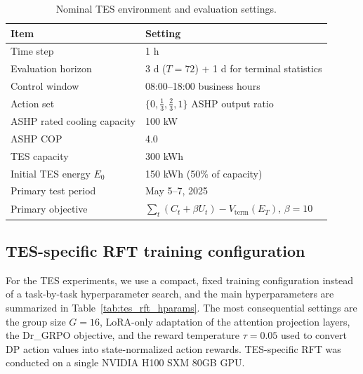 \documentclass[11pt]{article}
\begin{document}
\begin{table}[t]
\centering
\caption{Nominal TES environment and evaluation settings.}
\label{tab:tes_environment}
\small
\begin{tabular}{ll}
\toprule
Item & Setting \\
\midrule
Time step & 1 h \\
Evaluation horizon & 3 d ($T=72$) + 1 d for terminal statistics \\
Control window & 08:00--18:00 business hours \\
Action set & $\{0,\frac{1}{3},\frac{2}{3},1\}$ ASHP output ratio \\
ASHP rated cooling capacity & 100 kW \\
ASHP COP & 4.0 \\
TES capacity & 300 kWh \\
Initial TES energy $E_0$ & 150 kWh (50\% of capacity) \\
Primary test period & May 5--7, 2025 \\
Primary objective & $\sum_t (C_t+\beta U_t)-V_{\mathrm{term}}(E_T)$, $\beta=10$ \\
\bottomrule
\end{tabular}
\end{table}
\subsection{TES-specific RFT training configuration}\label{subsec:rft-training-config}
For the TES experiments, we use a compact, fixed training configuration instead of a task-by-task hyperparameter search, and the main hyperparameters are summarized in Table~\ref{tab:tes_rft_hparams}. The most consequential settings are the group size $G=16$, LoRA-only adaptation of the attention projection layers, the Dr\_GRPO objective, and the reward temperature $\tau=0.05$ used to convert DP action values into state-normalized action rewards. TES-specific RFT was conducted on a single NVIDIA H100 SXM 80GB GPU.
\end{document}
